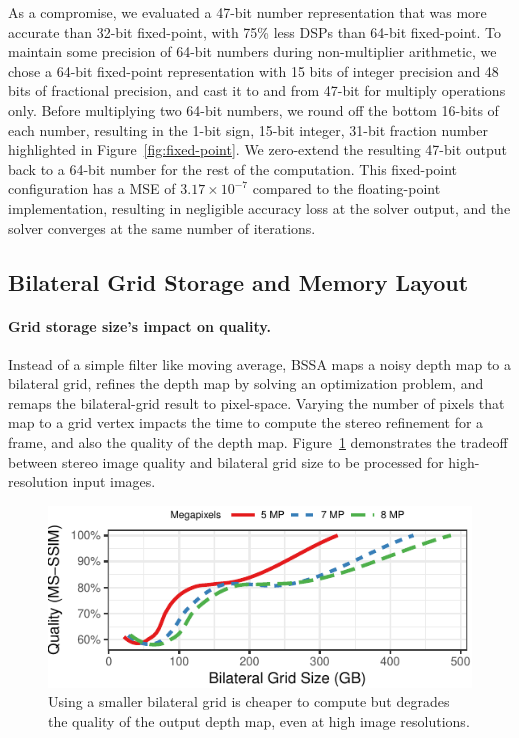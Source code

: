 As a compromise, we evaluated a 47-bit number representation that was more accurate than 32-bit fixed-point, with 75\% less DSPs than 64-bit fixed-point.
To maintain some precision of 64-bit numbers during non-multiplier arithmetic, we chose a 64-bit fixed-point representation with 15 bits of integer precision and 48 bits of fractional precision, and cast it to and from 47-bit for multiply operations only.
Before multiplying two 64-bit numbers, we round off the bottom 16-bits of each number, resulting in the 1-bit sign, 15-bit integer, 31-bit fraction number highlighted in Figure~\ref{fig:fixed-point}.
We zero-extend the resulting 47-bit output back to a 64-bit number for the rest of the computation.
This fixed-point configuration has a MSE of $3.17\times10^{-7}$ compared to the floating-point implementation, resulting in negligible accuracy loss at the solver output, and the solver converges at the same number of iterations.


\subsection{Bilateral Grid Storage and Memory Layout}

\paragraph{Grid storage size's impact on quality.} Instead of a simple filter like moving average, BSSA maps a noisy depth map to a bilateral grid, refines the depth map by solving an optimization problem, and remaps the bilateral-grid result to pixel-space. Varying the number of pixels that map to a grid vertex impacts the time to compute the stereo refinement for a frame, and also the quality of the depth map. Figure~\ref{fig:vr-res-qual} demonstrates the tradeoff between stereo image quality and bilateral grid size to be processed for high-resolution input images.

\begin{figure}[h]
\centering
    \begin{center}
\includegraphics[width=.45\textwidth]{nsp-figs/vr_res_qual.pdf}
    \end{center}
    \caption{Using a smaller bilateral grid is cheaper to compute but degrades the quality of the output depth map, even at high image resolutions. }
    \label{fig:vr-res-qual}
\end{figure}


